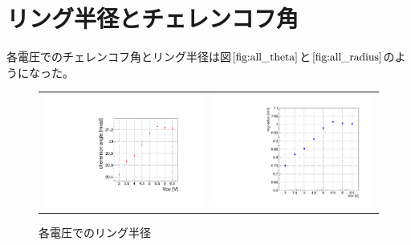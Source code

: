 \documentclass[uplatex, titlepage, dvipdfmx, 12pt, a4paper]{jsreport}
\begin{document}

  \section{リング半径とチェレンコフ角}
    各電圧でのチェレンコフ角とリング半径は図$\ref{fig:all_theta}$と$\ref{fig:all_radius}$のようになった。
    \begin{figure}[hbtp]
      \begin{tabular}{cc}
        \begin{minipage}[t]{0.45\hsize}
          \centering
          \includegraphics[scale=0.4, clip]{image/theta_allV.pdf}
          \caption{各電圧でのチェレンコフ角} 
          \label{fig:all_theta} 
        \end{minipage} &
        \begin{minipage}[t]{0.45\hsize}
          \centering
          \includegraphics[scale=0.3, clip]{image/all_radius.pdf}
          \caption{各電圧でのリング半径} 
          \label{fig:all_radius} 
        \end{minipage}
      \end{tabular}
    \end{figure}
\end{document}
